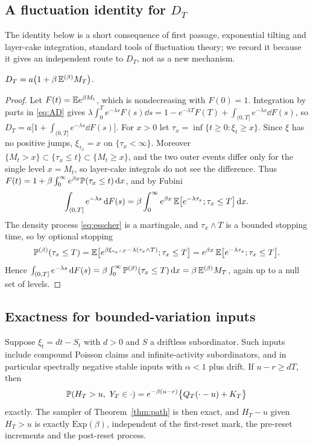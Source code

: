 \documentclass[11pt,a4paper]{article}
\begin{document}
\subsection{A fluctuation identity for \texorpdfstring{$D_T$}{D\_T}}

The identity below is a short consequence of first passage, exponential tilting and layer-cake integration, standard tools of fluctuation theory; we record it because it gives an independent route to $D_T$, not as a new mechanism.

\begin{proposition}\label{prop:identity}
$D_T=a\big(1+\beta\,\mathbb E^{(\beta)}M_T\big)$.
\end{proposition}

\begin{proof}
Let $F(t)=\mathbb E e^{\beta M_t}$, which is nondecreasing with $F(0)=1$. Integration by parts in \eqref{eq:AD} gives $\lambda\int_0^Te^{-\lambda s}F(s)\dd s=1-e^{-\lambda T}F(T)+\int_{(0,T]}e^{-\lambda s}\dd F(s)$, so $D_T=a\big[1+\int_{(0,T]}e^{-\lambda s}\dd F(s)\big]$. For $x>0$ let $\tau_x=\inf\{t\ge0:\xi_t\ge x\}$. Since $\xi$ has no positive jumps, $\xi_{\tau_x}=x$ on $\{\tau_x<\infty\}$. Moreover $\{M_t>x\}\subset\{\tau_x\le t\}\subset\{M_t\ge x\}$, and the two outer events differ only for the single level $x=M_t$, so layer-cake integrals do not see the difference. Thus $F(t)=1+\beta\int_0^\infty e^{\beta x}\mathbb P(\tau_x\le t)\,\mathrm d x$, and by Fubini
\[
 \int_{(0,T]}e^{-\lambda s}\,\mathrm d F(s)=\beta\int_0^\infty e^{\beta x}\,\mathbb E\big[e^{-\lambda\tau_x};\tau_x\le T\big]\,\mathrm d x .
\]
The density process \eqref{eq:esscher} is a martingale, and $\tau_x\wedge T$ is a bounded stopping time, so by optional stopping
\[
 \mathbb P^{(\beta)}(\tau_x\le T)=\mathbb E\big[e^{\beta\xi_{\tau_x\wedge T}-\lambda(\tau_x\wedge T)};\tau_x\le T\big]=e^{\beta x}\,\mathbb E\big[e^{-\lambda\tau_x};\tau_x\le T\big].
\]
Hence $\int_{(0,T]}e^{-\lambda s}\,\mathrm d F(s)=\beta\int_0^\infty\mathbb P^{(\beta)}(\tau_x\le T)\,\mathrm d x=\beta\,\mathbb E^{(\beta)}M_T$, again up to a null set of levels.
\end{proof}

\subsection{Exactness for bounded-variation inputs}

\begin{corollary}\label{cor:bv}
Suppose $\xi_t=dt-S_t$ with $d>0$ and $S$ a driftless subordinator. Such inputs include compound Poisson claims and infinite-activity subordinators, and in particular spectrally negative stable inputs with $\alpha<1$ plus drift. If $u-r\ge dT$, then
\[
 \PP(H_T>u,\ Y_T\in\cdot)=e^{-\beta(u-r)}\big\{Q_T(\cdot-u)+K_T\big\}
\]
exactly. The sampler of Theorem~\ref{thm:path} is then exact, and $H_T-u$ given $H_T>u$ is exactly $\mathrm{Exp}(\beta)$, independent of the first-reset mark, the pre-reset increments and the post-reset process.
\end{corollary}
\end{document}

